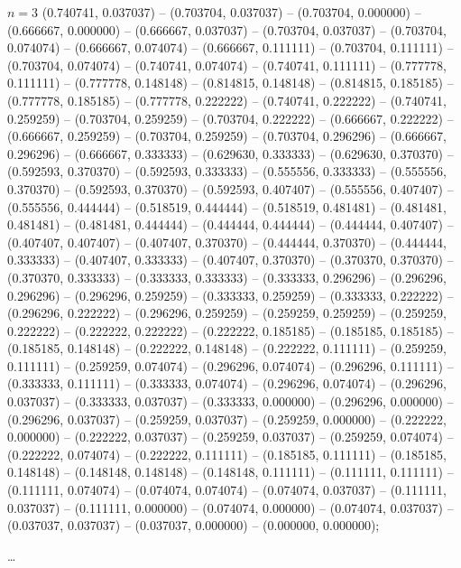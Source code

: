 \begin{zzfrac}{$n = 3$}
  (0.740741, 0.037037) --
  (0.703704, 0.037037) --
  (0.703704, 0.000000) --
  (0.666667, 0.000000) --
  (0.666667, 0.037037) --
  (0.703704, 0.037037) --
  (0.703704, 0.074074) --
  (0.666667, 0.074074) --
  (0.666667, 0.111111) --
  (0.703704, 0.111111) --
  (0.703704, 0.074074) --
  (0.740741, 0.074074) --
  (0.740741, 0.111111) --
  (0.777778, 0.111111) --
  (0.777778, 0.148148) --
  (0.814815, 0.148148) --
  (0.814815, 0.185185) --
  (0.777778, 0.185185) --
  (0.777778, 0.222222) --
  (0.740741, 0.222222) --
  (0.740741, 0.259259) --
  (0.703704, 0.259259) --
  (0.703704, 0.222222) --
  (0.666667, 0.222222) --
  (0.666667, 0.259259) --
  (0.703704, 0.259259) --
  (0.703704, 0.296296) --
  (0.666667, 0.296296) --
  (0.666667, 0.333333) --
  (0.629630, 0.333333) --
  (0.629630, 0.370370) --
  (0.592593, 0.370370) --
  (0.592593, 0.333333) --
  (0.555556, 0.333333) --
  (0.555556, 0.370370) --
  (0.592593, 0.370370) --
  (0.592593, 0.407407) --
  (0.555556, 0.407407) --
  (0.555556, 0.444444) --
  (0.518519, 0.444444) --
  (0.518519, 0.481481) --
  (0.481481, 0.481481) --
  (0.481481, 0.444444) --
  (0.444444, 0.444444) --
  (0.444444, 0.407407) --
  (0.407407, 0.407407) --
  (0.407407, 0.370370) --
  (0.444444, 0.370370) --
  (0.444444, 0.333333) --
  (0.407407, 0.333333) --
  (0.407407, 0.370370) --
  (0.370370, 0.370370) --
  (0.370370, 0.333333) --
  (0.333333, 0.333333) --
  (0.333333, 0.296296) --
  (0.296296, 0.296296) --
  (0.296296, 0.259259) --
  (0.333333, 0.259259) --
  (0.333333, 0.222222) --
  (0.296296, 0.222222) --
  (0.296296, 0.259259) --
  (0.259259, 0.259259) --
  (0.259259, 0.222222) --
  (0.222222, 0.222222) --
  (0.222222, 0.185185) --
  (0.185185, 0.185185) --
  (0.185185, 0.148148) --
  (0.222222, 0.148148) --
  (0.222222, 0.111111) --
  (0.259259, 0.111111) --
  (0.259259, 0.074074) --
  (0.296296, 0.074074) --
  (0.296296, 0.111111) --
  (0.333333, 0.111111) --
  (0.333333, 0.074074) --
  (0.296296, 0.074074) --
  (0.296296, 0.037037) --
  (0.333333, 0.037037) --
  (0.333333, 0.000000) --
  (0.296296, 0.000000) --
  (0.296296, 0.037037) --
  (0.259259, 0.037037) --
  (0.259259, 0.000000) --
  (0.222222, 0.000000) --
  (0.222222, 0.037037) --
  (0.259259, 0.037037) --
  (0.259259, 0.074074) --
  (0.222222, 0.074074) --
  (0.222222, 0.111111) --
  (0.185185, 0.111111) --
  (0.185185, 0.148148) --
  (0.148148, 0.148148) --
  (0.148148, 0.111111) --
  (0.111111, 0.111111) --
  (0.111111, 0.074074) --
  (0.074074, 0.074074) --
  (0.074074, 0.037037) --
  (0.111111, 0.037037) --
  (0.111111, 0.000000) --
  (0.074074, 0.000000) --
  (0.074074, 0.037037) --
  (0.037037, 0.037037) --
  (0.037037, 0.000000) --
  (0.000000, 0.000000);
\end{zzfrac}
%
\zzfracskip\dots
%

